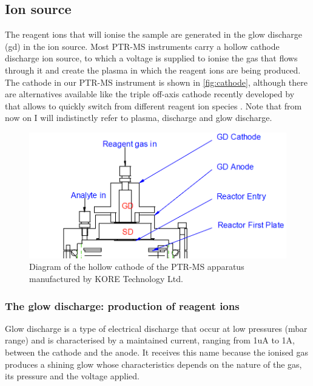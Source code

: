\subsection{Ion source}
The reagent ions that will ionise the sample are generated in the glow discharge (\acrshort{gd}) %
in the ion source. Most PTR-MS instruments carry a hollow cathode discharge ion source, to which a voltage is supplied to ionise the gas that flows through it and create the plasma in which the reagent ions are being produced.
%
The cathode in our PTR-MS instrument is shown in \autoref{fig:cathode},
although there are alternatives available like the triple off-axis cathode recently developed by \citeauthor{trion} that  allows to quickly switch from different reagent ion species
\cite{trion}.
%
Note that from now on I will indistinctly refer to plasma, discharge and glow discharge.






\begin{figure}[t]
\centering
\includegraphics[width=0.6\linewidth]{pics/cathode.png}
\centering
\caption{Diagram of the hollow cathode of the PTR-MS apparatus manufactured by KORE Technology Ltd.}
\label{fig:cathode}
\end{figure}








\subsubsection{The glow discharge: production of reagent ions}
Glow discharge is a type of electrical discharge that occur at low pressures (mbar range) and is characterised by a maintained current, ranging from 1uA to 1A, between the cathode and the anode. It receives this name because the ionised gas produces a shining glow whose characteristics depends on the nature of the gas, its pressure and the voltage applied.

